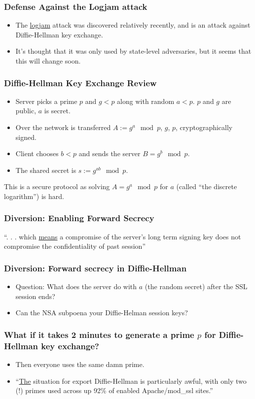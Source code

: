 \documentclass[9pt]{beamer}
\begin{document}
\begin{frame}[fragile]
\frametitle{Defense Against the Logjam attack}
\begin{itemize}
\item The \href{https://weakdh.org/}{logjam} attack was discovered relatively recently, and is an attack against Diffie-Hellman key exchange. 
\pause
\item It's thought that it was only used by state-level adversaries, but it seems that this will change soon.
\end{itemize}
\end{frame}

\begin{frame}[fragile]
\frametitle{Diffie-Hellman Key Exchange Review}
\begin{itemize}
\item Server picks a prime $p$ and $g < p$ along with random $a< p$. $p$ and $g$ are public, $a$ is secret. 
\pause
\item Over the network is transferred $A := g^{a} \mod p$, $g$, $p$, cryptographically signed.
\pause
\item Client chooses $b < p$ and sends the server $B = g^{b}\mod p$.
\pause
\item The shared secret is $s := g^{ab} \mod p$.
\pause
\end{itemize}
This is a secure protocol as solving $A = g^{a} \mod p$ for $a$ (called ``the discrete logarithm'') is hard.
\end{frame}

\begin{frame}[fragile]
\frametitle{Diversion: Enabling Forward Secrecy}
 ``. . . which \href{https://www.owasp.org/index.php/Transport_Layer_Protection_Cheat_Sheet}{means} a compromise of the server's long term signing key does not compromise the confidentiality of past session'' 
\end{frame}

\begin{frame}[fragile]
\frametitle{Diversion: Forward secrecy in Diffie-Hellman}
\begin{itemize}
\item Question: What does the server do with $a$ (the random secret) after the SSL session ends?
\pause
\item  Can the NSA subpoena your Diffie-Helman session keys?
\end{itemize}
\end{frame}

\begin{frame}[fragile]
\frametitle{What if it takes 2 minutes to generate a prime $p$ for Diffie-Hellman key exchange?}
\begin{itemize}
\item Then everyone uses the same damn prime.
\pause
\item ``\href{http://blog.cryptographyengineering.com/2015/05/attack-of-week-logjam.html}{The} situation for export Diffie-Hellman is particularly awful, with only two (!) primes used across up 92\% of enabled Apache/mod\_ssl sites.''
\end{itemize}
\end{frame}
\end{document}
